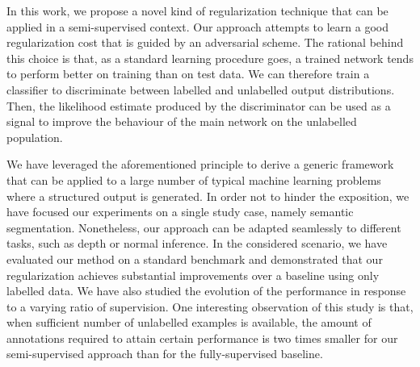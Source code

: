 \documentclass[a4paper]{article}
\begin{document}
In this work, we propose a novel kind of regularization technique that can be applied in a semi-supervised context. Our approach attempts to learn a good
regularization cost that is guided by an adversarial scheme. The rational behind this 
choice is that, as a standard learning procedure goes, a trained network tends to perform better on training than on test data. We can
therefore train a classifier to discriminate between labelled and unlabelled output
distributions. Then, the likelihood estimate produced by the discriminator can be
used as a signal to improve the behaviour of the main network on the unlabelled population.

We have leveraged the aforementioned principle to derive a generic framework that 
can be applied to a large number of typical machine learning problems where 
a structured output is generated. In order not to hinder the exposition, we have 
focused our experiments on a single study case, namely semantic segmentation. 
Nonetheless, our approach can be adapted seamlessly to different tasks,
such as depth or normal inference. In the considered scenario,
we have evaluated our method on a standard benchmark and demonstrated that
our regularization achieves substantial improvements over a baseline using
only labelled data. We have also studied the evolution of the performance 
in response to a varying ratio of supervision.
One interesting observation of this 
study is that, when sufficient number of unlabelled examples is available, 
the amount of annotations required to attain certain performance is two times smaller for our semi-supervised approach than for the fully-supervised baseline.





\end{document}
